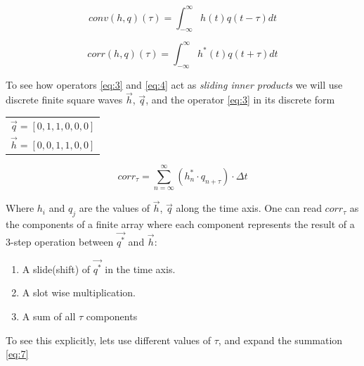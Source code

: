 \begin{equation}\label{eq:3}
conv(h, q)(\tau)= \int_{-\infty}^{\infty} h(t)q(t-\tau)dt
\end{equation}


\begin{equation}\label{eq:4}
corr(h, q)(\tau)= \int_{-\infty}^{\infty} h^*(t)q(t+\tau)dt
\end{equation}

To see how operators \ref{eq:3} and \ref{eq:4} act as \textit{sliding inner products} we will use discrete finite square waves $\vec{h}$, $\vec{q}$, and the operator \ref{eq:3} in its discrete form 


\vspace{0.5cm}

\begin{center}

\begin{tabular}{c}
$ \vec{q} = [0,1,1,0,0,0]$ \\
$ \vec{h} = [0,0,1,1,0,0]$

\end{tabular}

\end{center}

\vspace{0.5cm}

\begin{equation}\label{eq:7}
corr_{\tau} = \sum_{n=\infty}^{\infty} (h^*_{n} \cdot q_{n+\tau}) \cdot \Delta t
\end{equation}


Where $h_i$ and $q_j$  are the values of $\vec{h}$, $\vec{q}$ along the time axis. One can read $corr_\tau$ as the components of a finite array where each component represents  the result of a 3-step operation between $\vec{q^*}$ and $\vec{h}$:

\begin{enumerate}
\item A slide(shift) of $\vec{q^*}$ in the time axis.
\item A slot wise multiplication.
\item A sum of all $\tau$ components
\end{enumerate}

To see this explicitly, lets use different values of $\tau$, and expand the summation \ref{eq:7} 

